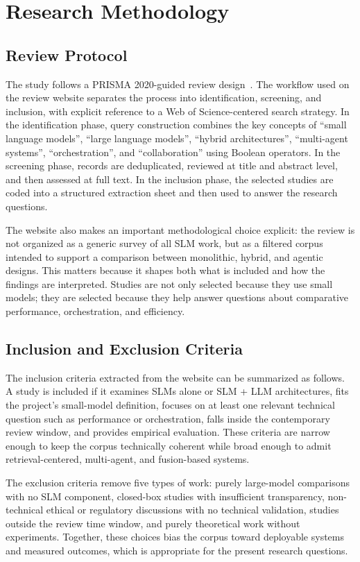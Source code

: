 \section{Research Methodology}
\subsection{Review Protocol}
The study follows a PRISMA 2020-guided review design~\cite{page2021prisma}. The workflow used on the review website separates the process into identification, screening, and inclusion, with explicit reference to a Web of Science-centered search strategy. In the identification phase, query construction combines the key concepts of ``small language models'', ``large language models'', ``hybrid architectures'', ``multi-agent systems'', ``orchestration'', and ``collaboration'' using Boolean operators. In the screening phase, records are deduplicated, reviewed at title and abstract level, and then assessed at full text. In the inclusion phase, the selected studies are coded into a structured extraction sheet and then used to answer the research questions.

The website also makes an important methodological choice explicit: the review is not organized as a generic survey of all SLM work, but as a filtered corpus intended to support a comparison between monolithic, hybrid, and agentic designs. This matters because it shapes both what is included and how the findings are interpreted. Studies are not only selected because they use small models; they are selected because they help answer questions about comparative performance, orchestration, and efficiency.

\subsection{Inclusion and Exclusion Criteria}
The inclusion criteria extracted from the website can be summarized as follows. A study is included if it examines SLMs alone or SLM + LLM architectures, fits the project's small-model definition, focuses on at least one relevant technical question such as performance or orchestration, falls inside the contemporary review window, and provides empirical evaluation. These criteria are narrow enough to keep the corpus technically coherent while broad enough to admit retrieval-centered, multi-agent, and fusion-based systems.

The exclusion criteria remove five types of work: purely large-model comparisons with no SLM component, closed-box studies with insufficient transparency, non-technical ethical or regulatory discussions with no technical validation, studies outside the review time window, and purely theoretical work without experiments. Together, these choices bias the corpus toward deployable systems and measured outcomes, which is appropriate for the present research questions.

